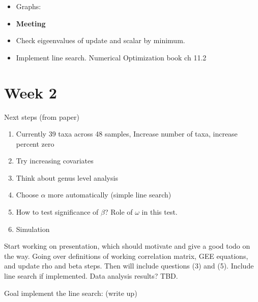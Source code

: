 \documentclass[10pt]{article}
\theoremstyle{definition}
\begin{document}
\begin{itemize}
\begin{itemize}
  \item \begin{verbatim}
    [1] "Iteration: 1"
  [1] "phi = 0.939547462231508, omega  = 0.935468698041697 , rho = 3.17044241846978"
  [1] "Beta iteration 1"
  [1] "Difference = 731.214064026175"
  [1] "Iteration: 2"
  [1] "phi = 1.74415189832243e-55, omega  = 0 , rho = 363.857722495099"
  [1] "Beta iteration 1"
  [1] "Difference = 0"
  \end{verbatim}

  \item Try .5 Still only 2 loops.
\end{itemize}

\item Graphs:


\item \textbf{Meeting}
\item Check eigeenvalues of update and scalar by minimum.

\item Implement line search.
Numerical Optimization book ch 11.2

\end{itemize}


\section{Week 2}

Next steps (from paper)
\begin{enumerate}
  \item Currently 39 taxa across 48 samples, Increase number of taxa, increase percent zero
  \item Try increasing covariates
  \item Think about genus level analysis
  \item Choose $\alpha$ more automatically (simple line search)
  \item How to test significance of $\beta$? Role of $\omega$ in this test.
  \item Simulation
\end{enumerate}
Start working on presentation, which should motivate and give a good todo on the way. Going over definitions of working correlation matrix, GEE equations, and update rho and beta steps. Then will include questions (3) and (5). Include line search if implemented. Data analysis results? TBD.

Goal implement the line search: (write up)
\end{document}
